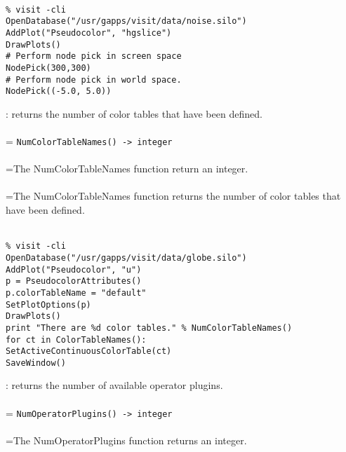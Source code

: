 \documentclass[10pt,a4paper]{report}
\begin{document}
\\[-6mm]
\begin{verbatim}% visit -cli
OpenDatabase("/usr/gapps/visit/data/noise.silo")
AddPlot("Pseudocolor", "hgslice")
DrawPlots()
# Perform node pick in screen space
NodePick(300,300)
# Perform node pick in world space.
NodePick((-5.0, 5.0))
\end{verbatim}
\newpage


{}
: returns the number of color tables that have been defined.\\[-3mm]

 \\ 
\hangindent=\parindent 
\verb!NumColorTableNames() -> integer!\\ [-3mm]

 \\ 
\hangindent=\parindent The NumColorTableNames function return an integer. \\[-3mm] 

 \\ 
\hangindent=\parindent The NumColorTableNames function returns the number of color tables that have been defined. \\[-3mm] 

\\[-6mm]
\begin{verbatim}% visit -cli
OpenDatabase("/usr/gapps/visit/data/globe.silo")
AddPlot("Pseudocolor", "u")
p = PseudocolorAttributes()
p.colorTableName = "default"
SetPlotOptions(p)
DrawPlots()
print "There are %d color tables." % NumColorTableNames()
for ct in ColorTableNames():
SetActiveContinuousColorTable(ct)
SaveWindow()
\end{verbatim}
\newpage


{}
: returns the number of available operator plugins.\\[-3mm]

 \\ 
\hangindent=\parindent 
\verb!NumOperatorPlugins() -> integer!\\ [-3mm]

 \\ 
\hangindent=\parindent The NumOperatorPlugins function returns an integer. \\[-3mm] 
\end{document}
